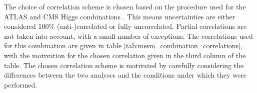 The choice of correlation scheme is chosen
based on the procedure used for the ATLAS and \ac{CMS}
Higgs combinations \cite{MassComb,CouplComb}. This means
uncertainties are either considered 100\% (anti-)correlated or fully uncorrelated. Partial
correlations are not taken into account, with a small number of exceptions. The
correlations used for this combination are given in table \ref{tab:mssm_combination_correlations},
with the motivation for the chosen correlation given in the third column of the table.
The chosen correlation scheme is motivated
by carefully considering the differences between the two analyses
and the conditions under which they were performed.


